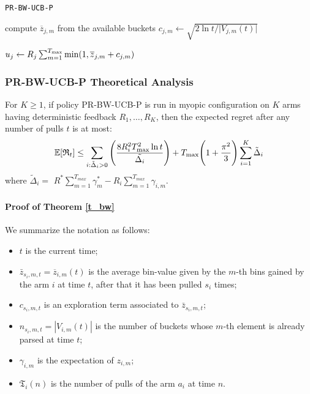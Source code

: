 \begin{algorithm}[H]
	\caption{\texttt{PR-BW-UCB-P}}
	\begin{scriptsize}
		\begin{algorithmic}[1]
			
			
			
			
			
			\State compute $\overline{z}_{j,m}$ from the available buckets \;
			\State$c_{j,m}\gets \sqrt{{2\ln t}/{\vert V_{j,m}(t) \vert}}$\;
			
			\EndFor		
			
			\State $u_j \gets R_j \sum_{m=1}^{T_{\textnormal{max}}} \min(1,\overline{z}_{j,m}+c_{j,m}) $\;	
			\EndFor
			
			
			
			
			\EndFunction
			
		\end{algorithmic}
	\end{scriptsize}
	\label{alg:Bound1}
\end{algorithm}
\subsubsection{PR-BW-UCB-P Theoretical Analysis}

\begin{theorem}
	For $K \ge 1$, if policy PR-BW-UCB-P is run in myopic configuration on $K$ arms having deterministic feedback $R_1,\dots,R_K$, then the expected regret after any number of pulls $t$ is at most:
	\[ \mathbb{E}[\mathfrak{R}_t] \le \sum_{i:\tilde{\Delta}_i>0} \Bigg( \frac{8 R_i^2 T_{\textnormal{max}}^2\ln t }{\tilde{\Delta_i}} \Bigg) + T_{\textnormal{max}}\Bigg( 1 + \frac{\pi^2}{3} \Bigg)\sum_{i=1}^{K} \tilde{\Delta}_i\]
	where $\tilde{\Delta}_i =$  $R^*\sum_{m=1}^{T_{max}}\gamma^*_{m} - R_i \sum_{m=1}^{T_{max}} \gamma_{i,m}$.
	\label{t_bw}
\end{theorem} 



\paragraph{Proof of Theorem \ref{t_bw}}

We summarize the notation as follows: 

\begin{itemize}
	\item $t$ is the current time;
	\item $\bar{z}_{s_i,m,t} = \overline{z}_{i,m}(t)$  is the average bin-value given by the $m$-th bins gained by the arm $i$ at time $t$, after that it has been pulled $s_i$ times;
	\item $c_{s_i,m,t}$ is an exploration term associated to $\bar{z}_{s_i,m,t}$;
	\item $n_{s_i,m,t}=|V_{i,m}(t)|$ is the number of buckets whose $m$-th element is already parsed at time $t$;
	\item $\gamma_{i,m}$ is the expectation of $z_{i,m}$;
	\item $\mathfrak{T}_i(n)$  is the number of pulls of the arm $a_i$ at time $n$.
\end{itemize}

